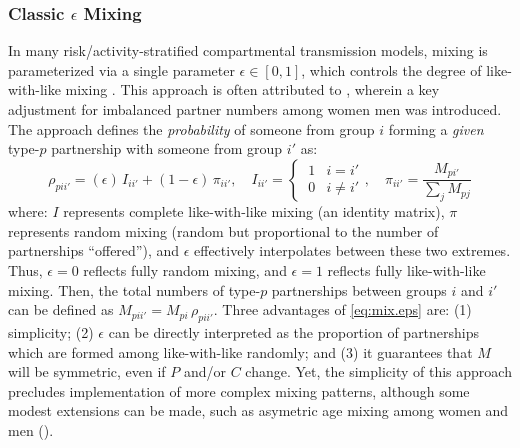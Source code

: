 \subsubsection{Classic $\epsilon$ Mixing}\label{model.par.mix.eps}
In many risk/activity-stratified compartmental transmission models,
mixing is parameterized via a single parameter $\epsilon \in [0,1]$,
which controls the degree of like-with-like mixing \cite{Nold1980}.
This approach is often attributed to \cite{Garnett1994},
wherein a key adjustment for imbalanced partner numbers among women \vs men was introduced.
The approach defines the \emph{probability} of
someone from group $i$ forming a \emph{given} type-$p$ partnership with someone from group $i'$ as:
\begin{equation}\label{eq:mix.eps}
  \rho_{pii'} = (\epsilon)\,I_{ii'} + (1 - \epsilon)\,\pi_{ii'},
  \quad I_{ii'} = \begin{cases} ~1 & i = i'\\ ~0 & i \ne i' \end{cases},
  \quad \pi_{ii'} = \frac{M_{pi'}}{\sum_{j}M_{pj}}
\end{equation} where:
$I$ represents complete like-with-like mixing (an identity matrix),
$\pi$ represents random mixing (random but proportional to the number of partnerships ``offered''),
and $\epsilon$ effectively interpolates between these two extremes.
Thus, $\epsilon = 0$ reflects fully random mixing,
and $\epsilon = 1$ reflects fully like-with-like mixing.
Then, the total numbers of type-$p$ partnerships between groups $i$ and $i'$ can be
defined as $M_{pii'} = M_{pi}\,\rho_{pii'}$.
Three advantages of \eqref{eq:mix.eps} are:
(1) simplicity;
(2) $\epsilon$ can be directly interpreted as the proportion of partnerships
which are formed among like-with-like \vs randomly; and
(3) it guarantees that $M$ will be symmetric, even if $P$ and/or $C$ change.
Yet, the simplicity of this approach precludes implementation of more complex mixing patterns,
although some modest extensions can be made,
such as asymetric age mixing among women and men (\eg \cite{Cremin2013}).
